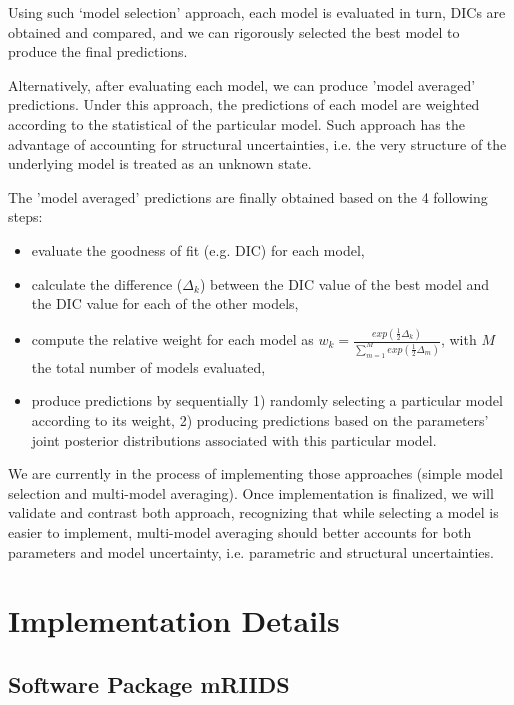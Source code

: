 \documentclass[11pt,]{article}
\begin{document}
Using such `model selection' approach, each model is evaluated in turn, DICs are obtained and compared, and
we can rigorously selected the best model to produce the final predictions.

Alternatively, after evaluating each model, we can produce 'model averaged' predictions. Under this approach, the predictions
of each model are weighted according to the statistical of the particular model. Such approach has the advantage of accounting
for structural uncertainties, i.e. the very structure of the underlying model is treated as an unknown state.

The 'model averaged' predictions are finally obtained based on the 4 following steps:
\begin{itemize}
\item evaluate the goodness of fit (e.g. DIC) for each model,
\item calculate the difference ($\Delta_k$) between the DIC value of the best model and the DIC value for each of the other models,
\item compute the relative weight for each model as $w_k = \frac{exp(\frac{1}{2}\Delta_k)}{\sum_{m = 1}^{M}{exp(\frac{1}{2}\Delta_m)}}$, with $M$ the total number of models evaluated,
\item produce predictions by sequentially 1) randomly selecting a particular model according to its weight, 2) producing predictions based on the parameters' joint posterior distributions associated with this particular model.
\end{itemize}

We are currently in the process of implementing those approaches (simple model selection and multi-model averaging).
Once implementation is finalized, we will validate and contrast both approach, recognizing that while selecting a model 
is easier to implement, multi-model averaging should better
accounts for both parameters and model uncertainty, i.e. parametric and structural uncertainties.


\section{Implementation Details}
\subsection{Software Package mRIIDS}
\end{document}
